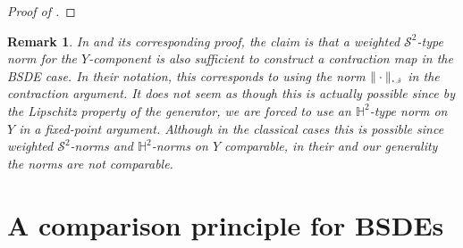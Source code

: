 \documentclass[10pt]{article} %
\newtheorem{remark}[theorem]{Remark}
\newcommand\cS{\mathcal S}
\newcommand{\smalltext}[1]{\text{\fontsize{4}{4}\selectfont$#1$}}
\def \H{\mathbb{H}}
\newcommand{\1}{\mathbf{1}}
\begin{document}
\begin{proof}[Proof of ]
\end{proof}

\begin{remark}
	In {\rm\cite[Theorem 3.5]{papapantoleon2018existence}} and its corresponding proof, the claim is that a weighted $\cS^2$-type norm for the $Y$-component is also sufficient to construct a contraction map in the \emph{BSDE} case. In their notation, this corresponds to using the norm $\|\cdot\|_{\smalltext{\star}\smalltext{,}\smalltext{\hat\beta}}$ in the contraction argument. It does not seem as though this is actually possible since by the Lipschitz property of the generator, we are forced to use an $\H^2$-type norm on $Y$ in a fixed-point argument. Although in the classical cases this is possible since weighted $\cS^2$-norms and $\H^2$-norms on $Y$ comparable, in their and our generality the norms are not comparable.	
\end{remark}

\section{A comparison principle for BSDEs}\label{sec::comparison}
\end{document}
